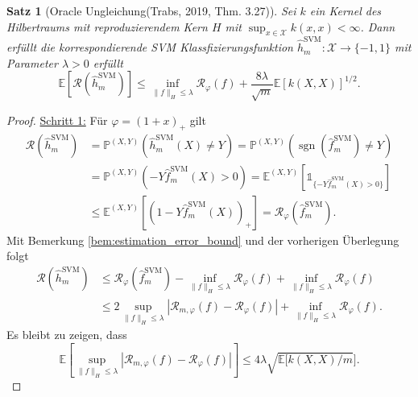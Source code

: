 \documentclass{article}
\DeclareMathOperator{\sign}{sgn}
\theoremstyle{plain}
\newtheorem{thm}{Satz}[subsection]
\theoremstyle{definition}
\begin{document}
    \begin{thm}[Oracle Ungleichung(Trabs, 2019, \cite{trabs} Thm. 3.27)]\label{thm:oracle_inequality}
        Sei $k$ ein Kernel des Hilbertraums mit reproduzierendem Kern $H$ mit $\sup_{x\in \mathcal{X}} k(x,x) < \infty$. Dann erfüllt die korrespondierende SVM Klassfizierungsfunktion $\hat{h}_{m}^{\text{SVM}}: \mathcal{X} \to \{-1,1\}$ mit Parameter $\lambda > 0$ erfüllt
        \[
            \mathbb{E}[\mathcal{R}(\hat{h}_{m}^{\text{SVM}})] \leq \inf_{\|f\|_{H} \leq \lambda} \mathcal{R}_{\varphi}(f) + \frac{8 \lambda}{\sqrt{m}} \mathbb{E}[k(X,X)]^{1/2}.
        \]
    \end{thm}
    \begin{proof}
        \underline{Schritt 1:} Für $\varphi = (1 + x)_{+}$ gilt
        \[
            \begin{split}
            \mathcal{R}(\hat{h}_{m}^{\text{SVM}}) 
            &= \mathbb{P}^{(X,Y)}(\hat{h}_{m}^{\text{SVM}}(X) \neq Y)
            = \mathbb{P}^{(X,Y)}(\sign(\hat{f}_{m}^{\text{SVM}}) \neq Y) \\
            &= \mathbb{P}^{(X,Y)}(-Y \hat{f}_{m}^{\text{SVM}}(X) > 0)
            = \mathbb{E}^{(X,Y)}[\mathds{1}_{\{-Y \hat{f}_{m}^{\text{SVM}}(X) > 0\}}] \\
            &\leq \mathbb{E}^{(X,Y)}[(1-Y \hat{f}_{m}^{\text{SVM}}(X))_{+}]
            = \mathcal{R}_{\varphi}(\hat{f}_{m}^{\text{SVM}}).
            \end{split}
        \]
        Mit Bemerkung \ref{bem:estimation_error_bound} und der vorherigen Überlegung folgt
        \[
           \begin{split}
           \mathcal{R}(\hat{h}_{m}^{\text{SVM}})
            &\leq \mathcal{R}_{\varphi}(\hat{f}_{m}^{\text{SVM}}) - \inf_{\|f\|_{H} \leq \lambda} \mathcal{R}_{\varphi}(f) + \inf_{\|f\|_{H} \leq \lambda} \mathcal{R}_{\varphi}(f) \\
            &\leq 2 \sup_{\|f\|_{H} \leq \lambda} |\mathcal{R}_{m,\varphi}(f) - \mathcal{R}_{\varphi}(f) | + \inf_{\|f\|_{H} \leq \lambda} \mathcal{R}_{\varphi}(f).
            \end{split}
        \]
        Es bleibt zu zeigen, dass
        \[
            \mathbb{E}[\sup_{\|f\|_{H} \leq \lambda} |\mathcal{R}_{m, \varphi}(f)-\mathcal{R}_{\varphi}(f)|]
            \leq 4 \lambda \sqrt{\mathbb{E}[k(X,X)/m}].
        \]
        

\end{proof}
\end{document}
